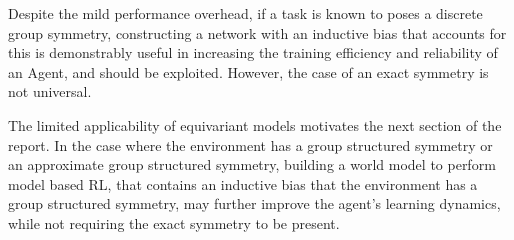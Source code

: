 Despite the mild performance overhead, if a task is known to poses a discrete group symmetry, constructing a network with an inductive bias that accounts for this is demonstrably useful in increasing the training efficiency and reliability of an Agent, and should be exploited. However, the case of an exact symmetry is not universal.

The limited applicability of equivariant models motivates the next section of the report. In the case where the environment has a group structured symmetry or an approximate group structured symmetry, building a world model to perform model based RL, that contains an inductive bias that the environment has a group structured symmetry, may further improve the agent's learning dynamics, while not requiring the exact symmetry to be present.



